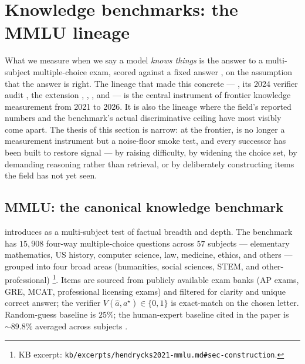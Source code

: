 
\section{Knowledge benchmarks: the MMLU lineage}
\label{sec:knowledge-benchmarks}

What we measure when we say a model \emph{knows things} is the answer
to a multi-subject multiple-choice exam, scored against a fixed answer
, on the assumption that the answer  is right. The lineage that
made this concrete ---  \citep{hendrycks2021-mmlu}, its 2024
verifier audit \citep{mmlu-redux-2024}, the  extension
\citep{wang2024-mmlu-pro},  \citep{rein2023-gpqa},
 \citep{glazer2024-frontiermath}, and 
\citep{phan2025-hle} --- is the central instrument of frontier
knowledge measurement from 2021 to 2026. It is also the lineage where
the field's reported numbers and the benchmark's actual discriminative
ceiling have most visibly come apart. The thesis of this section is
narrow: at the frontier,  is no longer a measurement instrument
but a noise-floor smoke test, and every successor has been built to
restore signal --- by raising difficulty, by widening the choice set,
by demanding reasoning rather than retrieval, or by deliberately
constructing items the field has not yet seen.

\subsection{MMLU: the canonical knowledge benchmark}
\label{sec:knowledge-mmlu}

\citet{hendrycks2021-mmlu} introduces  as a multi-subject test of
factual breadth and depth. The benchmark has $15{,}908$ four-way
multiple-choice questions across $57$ subjects --- elementary
mathematics, US history, computer science, law, medicine, ethics, and
others --- grouped into four broad areas (humanities, social sciences,
STEM, and other-professional)%
\footnote{KB excerpt: \texttt{kb/excerpts/hendrycks2021-mmlu.md\#sec-construction}.}.
Items are sourced from publicly available exam banks (AP exams, GRE,
MCAT, professional licensing exams) and filtered for clarity and
unique correct answer; the verifier $V(\hat{a}, a^\star) \in \{0, 1\}$
is exact-match on the chosen letter. Random-guess baseline is $25\%$;
the human-expert baseline cited in the paper is $\sim 89.8\%$
averaged across subjects \citep[\S{}abstract]{hendrycks2021-mmlu}.

